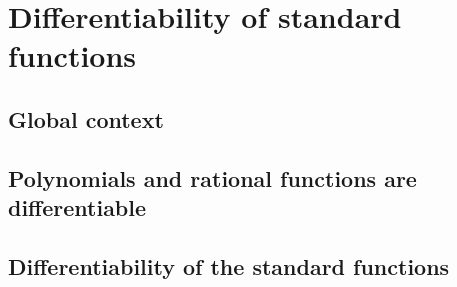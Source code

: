 \section{Differentiability of standard functions}

\subsection{Global context}

\subsection{Polynomials and rational functions are differentiable}

\subsection{Differentiability of the standard functions}
